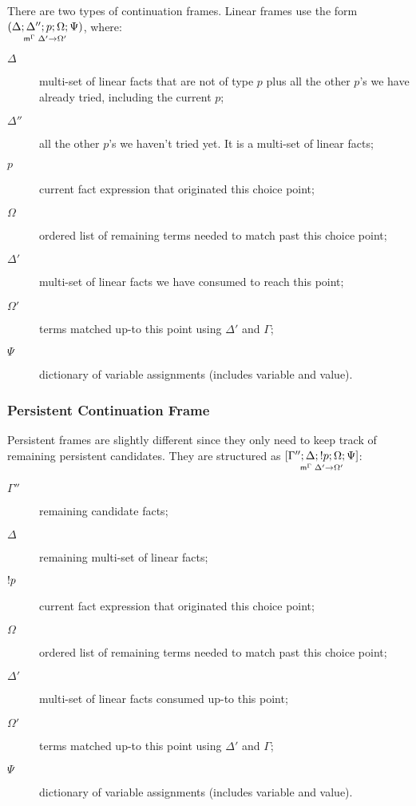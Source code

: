There are two types of continuation frames. Linear frames use the form
$\lframe{\Delta}{\Delta''}{p}{\Omega; \Psi}{\Delta'}{\Omega'}$, where:

\begin{description}
   \item[$\Delta$] multi-set of linear facts that are not of type $p$ plus all
   the other $p$'s we have already tried, including the current $p$;

   \item[$\Delta''$] all the other $p$'s we haven't tried yet. It is a multi-set
   of linear facts;

   \item[$p$] current fact expression that originated this choice point;

   \item[$\Omega$] ordered list of remaining terms needed to match past this
   choice point;

   \item[$\Delta'$] multi-set of linear facts we have consumed to reach this point;

   \item[$\Omega'$] terms matched up-to this point using $\Delta'$ and $\Gamma$;
   \item[$\Psi$] dictionary of variable assignments (includes variable and value).
\end{description}

\subsubsection{Persistent Continuation Frame}

Persistent frames are slightly different since they only need to keep track of
remaining persistent candidates. They are structured as $\pframe{\Gamma''}{\Delta}{\bang
   p}{\Omega; \Psi}{\Delta'}{\Omega'}$:

\begin{description}
   \item[$\Gamma''$] remaining candidate facts;
   \item[$\Delta$] remaining multi-set of linear facts;
   \item[$\bang p$] current fact expression that originated this choice point;
   \item[$\Omega$] ordered list of remaining terms needed to match past this
   choice point;
   \item[$\Delta'$] multi-set of linear facts consumed up-to this point;
   \item[$\Omega'$] terms matched up-to this point using $\Delta'$ and $\Gamma$;
   \item[$\Psi$] dictionary of variable assignments (includes variable and value).
\end{description}


